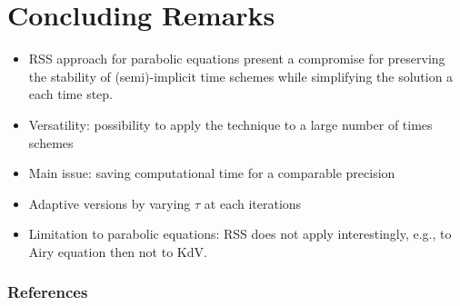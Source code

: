 \documentclass[hyperref={pdfpagemode=FullScreen},9pt]{beamer}
\begin{document}
 \section{Concluding Remarks}
 \begin{frame}
 \begin{itemize}
 \item RSS approach for parabolic equations present a compromise for preserving the stability of (semi)-implicit time schemes while simplifying the solution a each time step. 
 \item Versatility: possibility to apply the technique to a large number of times schemes
 \pause
 \item Main issue: saving computational time for a comparable precision
 \item Adaptive versions by varying $\tau$ at each iterations
 \item Limitation to parabolic equations: RSS does not apply interestingly, e.g.,  to Airy equation then not to KdV.
 \end{itemize}
 \end{frame}
 \begin{frame}[allowframebreaks]
	\frametitle{References}
	
		
	\nocite{*}
\end{frame}
\end{document}
